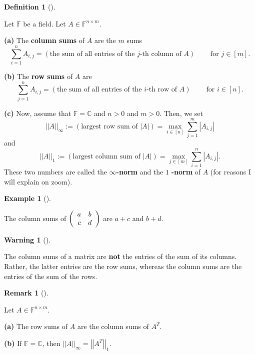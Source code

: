 \documentclass[numbers=enddot,12pt,final,onecolumn,notitlepage]{scrartcl}%
\numberwithin{exer}{subsection}
\theoremstyle{definition}
\newtheorem{defi}[theo]{Definition}
\newenvironment{definition}[1][]
{\begin{defi}[#1]\begin{leftbar}}
{\end{leftbar}\end{defi}}
\newtheorem{remk}[theo]{Remark}
\newenvironment{remark}[1][]
{\begin{remk}[#1]\begin{leftbar}}
{\end{leftbar}\end{remk}}
\newtheorem{warn}[theo]{Warning}
\newenvironment{warning}[1][]
{\begin{warn}[#1]\begin{leftbar}}
{\end{leftbar}\end{warn}}
\newtheorem{exam}[theo]{Example}
\newenvironment{example}[1][]
{\begin{exam}[#1]\begin{leftbar}}
{\end{leftbar}\end{exam}}
\newenvironment{warning}[1][Warning]{\noindent\textbf{#1.} }{\ \rule{0.5em}{0.5em}}
\let\sumnonlimits\sum
\renewcommand{\sum}{\sumnonlimits\limits}
\begin{document}
\begin{definition}
Let $\mathbb{F}$ be a field. Let $A\in\mathbb{F}^{n\times m}$.

\textbf{(a)} The \textbf{column sums} of $A$ are the $m$ sums
\[
\sum_{i=1}^{n}A_{i,j}=\left(  \text{the sum of all entries of the }j\text{-th
column of }A\right)  \ \ \ \ \ \ \ \ \ \ \text{for }j\in\left[  m\right]  .
\]


\textbf{(b)} The \textbf{row sums} of $A$ are%
\[
\sum_{j=1}^{n}A_{i,j}=\left(  \text{the sum of all entries of the }i\text{-th
row of }A\right)  \ \ \ \ \ \ \ \ \ \ \text{for }i\in\left[  n\right]  .
\]


\textbf{(c)} Now, assume that $\mathbb{F}=\mathbb{C}$ and $n>0$ and $m>0$.
Then, we set%
\[
\left\vert \left\vert A\right\vert \right\vert _{\infty}:=\left(
\text{largest row sum of }\left\vert A\right\vert \right)  =\max
\limits_{i\in\left[  n\right]  }\sum_{j=1}^{m}\left\vert A_{i,j}\right\vert
\]
and%
\[
\left\vert \left\vert A\right\vert \right\vert _{1}:=\left(  \text{largest
column sum of }\left\vert A\right\vert \right)  =\max\limits_{j\in\left[
m\right]  }\sum_{i=1}^{n}\left\vert A_{i,j}\right\vert .
\]
These two numbers are called the $\infty$\textbf{-norm} and the $1$%
\textbf{-norm} of $A$ (for reasons I will explain on zoom).
\end{definition}

\begin{example}
The column sums of $\left(
\begin{array}
[c]{cc}%
a & b\\
c & d
\end{array}
\right)  $ are $a+c$ and $b+d$.
\end{example}

\begin{warning}
The column sums of a matrix are \textbf{not} the entries of the sum of its
columns. Rather, the latter entries are the row sums, whereas the column sums
are the entries of the sum of the rows.
\end{warning}

\begin{remark}
Let $A\in\mathbb{F}^{n\times m}$.

\textbf{(a)} The row sums of $A$ are the column sums of $A^{T}$.

\textbf{(b)} If $\mathbb{F}=\mathbb{C}$, then $\left\vert \left\vert
A\right\vert \right\vert _{\infty}=\left\vert \left\vert A^{T}\right\vert
\right\vert _{1}$.
\end{remark}
\end{document}
